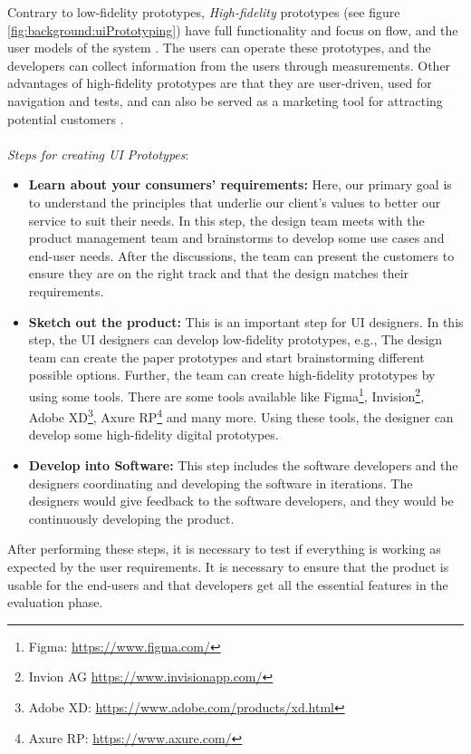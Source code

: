 Contrary to low-fidelity prototypes, \textit{High-fidelity} prototypes (see figure \ref{fig:background:uiPrototyping}) have full functionality and focus on flow, and the user models of the system \cite{article:prototyping:exploratory}.
The users can operate these prototypes, and the developers can collect information from the users through measurements. 
Other advantages of high-fidelity prototypes are that they are user-driven, used for navigation and tests, and can also be served as a marketing tool for attracting potential customers \cite{article:prototyping:highlowfidelity}.\\ \\
\textit{Steps for creating UI Prototypes}:
\begin{itemize}
  \item \textbf{Learn about your consumers' requirements:} Here, our primary goal is to understand the principles that underlie our client's values to better our service to suit their needs. In this step, the design team meets with the product management team and brainstorms to develop some use cases and end-user needs. After the discussions, the team can present the customers to ensure they are on the right track and that the design matches their requirements.
  \item \textbf{Sketch out the product:} This is an important step for UI designers. In this step, the UI designers can develop low-fidelity prototypes, e.g., The design team can create the paper prototypes and start brainstorming different possible options. Further, the team can create high-fidelity prototypes by using some tools. There are some tools available like Figma\footnote{Figma: \url{https://www.figma.com/}}, Invision\footnote{Invion AG \url{https://www.invisionapp.com/}}, Adobe XD\footnote{Adobe XD: \url{https://www.adobe.com/products/xd.html}}, Axure RP\footnote{Axure RP: \url{https://www.axure.com/}} and many more. Using these tools, the designer can develop some high-fidelity digital prototypes.
  \item \textbf{Develop into Software:} This step includes the software developers and the designers coordinating and developing the software in iterations. The designers would give feedback to the software developers, and they would be continuously developing the product.
\end{itemize}

After performing these steps, it is necessary to test if everything is working as expected by the user requirements.
It is necessary to ensure that the product is usable for the end-users and that developers get all the essential features in the evaluation phase. 
\clearpage

